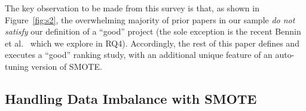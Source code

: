 \documentclass[sigconf]{acmart}
\theoremstyle{break}
\newcommand{\sma}{{\sc SMOTE}}
\newcommand{\smb}{{\sc SMOTUNED}}
\begin{document}
 



The key observation to be made from  this 
survey is that, as shown in Figure~\ref{fig:s2}, the overwhelming majority of
prior papers in our sample {\em do not satisfy}  our definition of a ``good'' project
(the sole exception is the  recent   Bennin et al.~\cite{bennin2017mahakil} which we explore in RQ4).
Accordingly, the rest of this
paper defines and executes a ``good'' ranking  study, with an additional
unique feature of   an auto-tuning version of {\sma}.

\subsection{Handling Data Imbalance with SMOTE}
\label{sect:smote}
\end{document}
